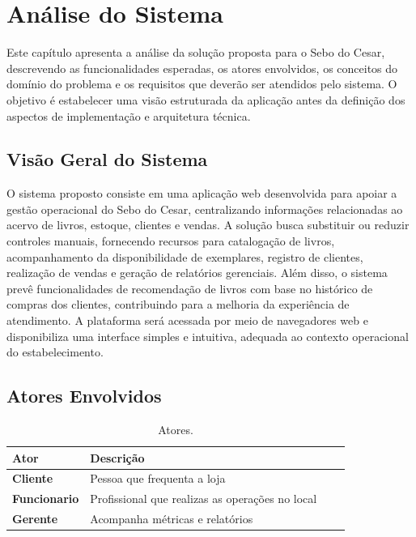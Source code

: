 \chapter{Análise do Sistema}

Este capítulo apresenta a análise da solução proposta para o Sebo do Cesar, descrevendo as funcionalidades esperadas, os atores envolvidos, os conceitos do domínio do problema e os requisitos que deverão ser atendidos pelo sistema. O objetivo é estabelecer uma visão estruturada da aplicação antes da definição dos aspectos de implementação e arquitetura técnica.

\section{Visão Geral do Sistema}
O sistema proposto consiste em uma aplicação web desenvolvida para apoiar a gestão operacional do Sebo do Cesar, centralizando informações relacionadas ao acervo de livros, estoque, clientes e vendas. A solução busca substituir ou reduzir controles manuais, fornecendo recursos para catalogação de livros, acompanhamento da disponibilidade de exemplares, registro de clientes, realização de vendas e geração de relatórios gerenciais. 
Além disso, o sistema prevê funcionalidades de recomendação de livros com base no histórico de compras dos clientes, contribuindo para a melhoria da experiência de atendimento. A plataforma será acessada por meio de navegadores web e disponibiliza uma interface simples e intuitiva, adequada ao contexto operacional do estabelecimento.

\section{Atores Envolvidos}
\begin{table}[htb]
\centering
\caption[Atores]{Atores.}
\label{tab-atores}
\begin{tabular}{p{2.6cm}|p{6.0cm}|p{2.25cm}|p{3.40cm}}
   \textbf{Ator} & \textbf{Descrição} \\
    \hline
    \textbf{Cliente} & Pessoa que frequenta a loja \\
    \hline
    \textbf{Funcionario} & Profissional que realizas as operações no local \\
    \hline
    \textbf{Gerente} & Acompanha métricas e relatórios \\
\end{tabular}
\end{table}

